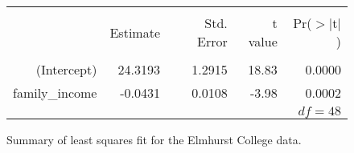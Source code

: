 \begin{figure}[ht]
\centering
\begin{tabular}{rrrrr}
  \hline
  \vspace{-3.7mm} & & & & \\
 & Estimate & Std. Error & t value & Pr($>$$|$t$|$) \\ 
  \hline
  \vspace{-3.6mm} & & & & \\
(Intercept) & 24.3193 & 1.2915 & 18.83 & 0.0000 \\ 
family\_\hspace{0.3mm}income & -0.0431 & 0.0108 & -3.98 & 0.0002 \\ 
   \hline
   \multicolumn{5}{r}{$df=48$} \\
\end{tabular}
\caption{Summary of least squares fit for the Elmhurst College data.}
\label{rOutputForIncomeAidLSRLineInInferenceSection}
\end{figure}





